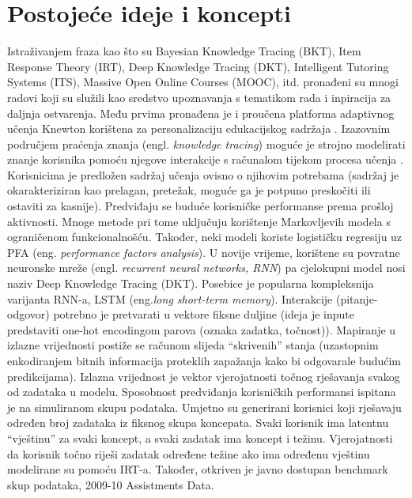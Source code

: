\chapter{Postojeće ideje i koncepti}
Istraživanjem fraza kao što su Bayesian Knowledge Tracing (BKT), Item Response Theory (IRT), Deep Knowledge Tracing (DKT), Intelligent Tutoring Systems (ITS), Massive Open Online Courses (MOOC), itd. pronađeni su mnogi radovi koji su služili kao sredstvo upoznavanja s tematikom rada i inpiracija za daljnja ostvarenja. 
\newline
\newline
Među prvima pronađena je i proučena platforma adaptivnog učenja Knewton korištena za personalizaciju edukacijskog sadržaja \citep{knewton}. 
\newline
\newline
Izazovnim područjem praćenja znanja (engl. \textit{knowledge tracing}) moguće je strojno modelirati znanje korisnika pomoću njegove interakcije s računalom tijekom procesa učenja \citep{dkt}. Korisnicima je predložen sadržaj učenja ovisno o njihovim potrebama (sadržaj je okarakteriziran kao prelagan, pretežak, moguće ga je potpuno preskočiti ili ostaviti za kasnije). Predviđaju se buduće korisničke performanse prema prošloj aktivnosti. Mnoge metode pri tome uključuju korištenje Markovljevih modela s ograničenom funkcionalnošću. Također, neki modeli koriste logističku regresiju uz PFA (eng. \textit{performance factors analysis}). U novije vrijeme, korištene su povratne neuronske mreže (engl. \textit{recurrent neural networks, RNN}) pa cjelokupni model nosi naziv Deep Knowledge Tracing (DKT). Posebice je popularna kompleksnija varijanta RNN-a, LSTM (eng.\textit{long short-term memory}). Interakcije (pitanje-odgovor) potrebno je pretvarati u vektore fiksne duljine (ideja je inpute predstaviti one-hot encodingom parova (oznaka zadatka, točnost)). Mapiranje u izlazne vrijednosti postiže se računom slijeda “skrivenih” stanja (uzastopnim enkodiranjem bitnih informacija proteklih zapažanja kako bi odgovarale budućim predikcijama). Izlazna vrijednost je vektor vjerojatnosti točnog rješavanja svakog od zadataka u modelu. 
Sposobnost predviđanja korisničkih performansi ispitana je na simuliranom skupu podataka. Umjetno su generirani korisnici koji rješavaju određen broj zadataka iz fiksnog skupa koncepata. Svaki korisnik ima latentnu “vještinu” za svaki koncept, a svaki zadatak ima koncept i težinu. Vjerojatnosti da korisnik točno riješi zadatak određene težine ako ima određenu vještinu modelirane su pomoću IRT-a. Također, otkriven je javno dostupan benchmark skup podataka, 2009-10 Assistments Data.
